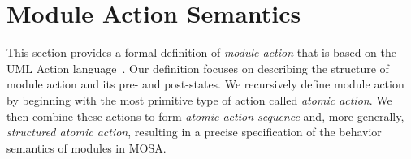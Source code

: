 \section{Module Action Semantics}
\label{sect:actSemantics}

This section provides a formal definition of \textit{module action} that is based on the UML Action language~\cite{omg_unified_2017}. %
Our definition focuses on describing the structure of module action and its pre- and post-states. %
%
We recursively define module action by beginning with the most primitive type of action called \textit{atomic action}. We then combine these actions to form \textit{atomic action sequence} and, more generally, \textit{structured atomic action}, resulting in a precise specification of the behavior semantics of modules in MOSA. 

